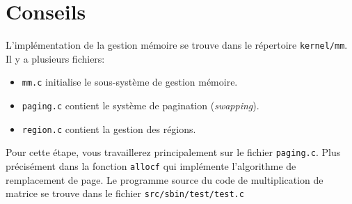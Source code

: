 \documentclass[a4paper,11pt]{article}
\begin{document}
\section*{Conseils}

L'implémentation de la gestion mémoire se trouve dans le répertoire {\tt kernel/mm}.
Il y a plusieurs fichiers:

\begin{itemize}
\item {\tt mm.c} initialise le sous-système de gestion mémoire.

\item {\tt paging.c} contient le système de pagination ({\em swapping}).

\item {\tt region.c} contient la gestion des régions.   
\end{itemize}

Pour cette étape, vous travaillerez principalement sur le fichier {\tt paging.c}.
Plus précisément dans la fonction {\tt allocf} qui implémente l'algorithme de remplacement
de page. Le programme source du code de  multiplication de matrice se trouve dans le
fichier {\tt src/sbin/test/test.c}
\end{document}
